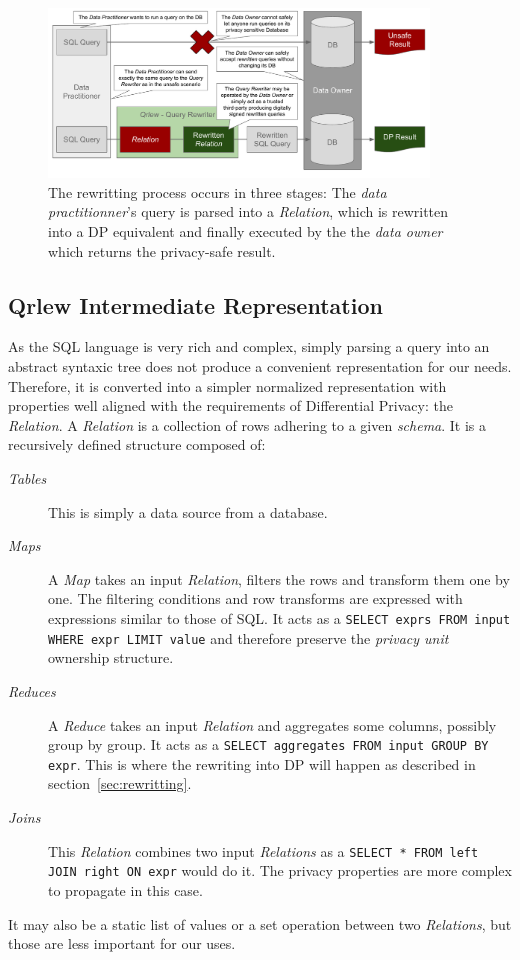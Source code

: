 \documentclass[letterpaper]{article} %
\begin{document}
\begin{figure}[t]
    \centering
    \includegraphics[width=0.9\textwidth]{figures/qrlew_process} %
    \caption{The rewritting process occurs in three stages: The \emph{data practitionner}'s query is parsed into a \emph{Relation}, which is rewritten into a DP equivalent and finally executed by the the \emph{data owner} which returns the privacy-safe result.}
    \label{fig:process}
\end{figure}

\subsection{Qrlew Intermediate Representation}

As the SQL language is very rich and complex, simply parsing a query into an abstract syntaxic tree does not produce a convenient representation for our needs. Therefore, it is converted into a simpler normalized representation with properties well aligned with the requirements of Differential Privacy: the \emph{Relation}. A \emph{Relation} is a collection of rows adhering to a given \emph{schema}. It is a recursively defined structure composed of:
\begin{description}
    \item[\emph{Tables}] This is simply a data source from a database.
    \item[\emph{Maps}] A \emph{Map} takes an input \emph{Relation}, filters the rows and transform them one by one. The filtering conditions and row transforms are expressed with expressions similar to those of SQL. It acts as a \texttt{SELECT exprs FROM input WHERE expr LIMIT value} and therefore preserve the \emph{privacy unit} ownership structure.
    \item[\emph{Reduces}] A \emph{Reduce} takes an input \emph{Relation} and aggregates some columns, possibly group by group. It acts as a \texttt{SELECT aggregates FROM input GROUP BY expr}. This is where the rewriting into DP will happen as described in section~\ref{sec:rewritting}.
    \item[\emph{Joins}] This \emph{Relation} combines two input \emph{Relations} as a \texttt{SELECT * FROM left JOIN right ON expr} would do it. The privacy properties are more complex to propagate in this case.
\end{description}
It may also be a static list of values or a set operation between two \emph{Relations}, but those are less important for our uses.
\end{document}
